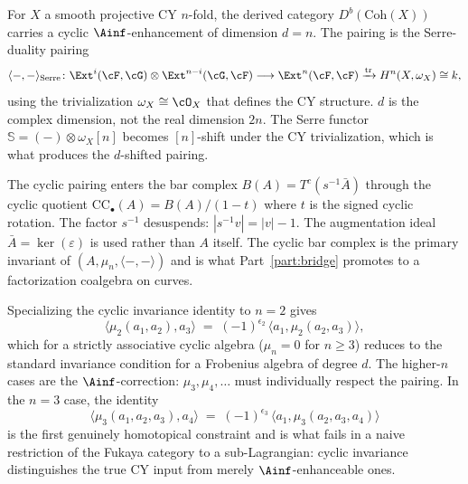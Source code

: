 \begin{remark}
\label{rem:d-geometric}
For $X$ a smooth projective CY $n$-fold, the derived category $D^b(\mathrm{Coh}(X))$ carries a cyclic $\Ainf$-enhancement of dimension $d = n$. The pairing is the Serre-duality pairing
\[
 \langle -, - \rangle_{\mathrm{Serre}} \colon
 \Ext^i(\cF, \cG) \otimes \Ext^{n-i}(\cG, \cF) \longrightarrow \Ext^n(\cF, \cF) \xrightarrow{\mathrm{tr}} H^n(X, \omega_X) \cong k,
\]
using the trivialization $\omega_X \cong \cO_X$ that defines the CY structure. $d$ is the complex dimension, not the real dimension $2n$. The Serre functor $\mathbb{S} = (-) \otimes \omega_X[n]$ becomes $[n]$-shift under the CY trivialization, which is what produces the $d$-shifted pairing.
\end{remark}

\begin{remark}
\label{rem:cyclic-bar-complex}
The cyclic pairing enters the bar complex $B(A) = T^c(s^{-1}\bar A)$ through the cyclic quotient $\mathrm{CC}_\bullet(A) = B(A)/(1 - t)$ where $t$ is the signed cyclic rotation. The factor $s^{-1}$ desuspends: $|s^{-1}v| = |v| - 1$. The augmentation ideal $\bar A = \ker(\varepsilon)$ is used rather than $A$ itself. The cyclic bar complex is the primary invariant of $(A, \mu_n, \langle-,-\rangle)$ and is what Part~\ref{part:bridge} promotes to a factorization coalgebra on curves.
\end{remark}

\begin{remark}[Cyclic symmetry at \texorpdfstring{$n = 2$}{n = 2}]
\label{rem:cyclic-n2}
Specializing the cyclic invariance identity to $n = 2$ gives
\[
 \langle \mu_2(a_1, a_2), a_3 \rangle \;=\; (-1)^{\epsilon_2}\, \langle a_1, \mu_2(a_2, a_3) \rangle,
\]
which for a strictly associative cyclic algebra ($\mu_n = 0$ for $n \geq 3$) reduces to the standard invariance condition for a Frobenius algebra of degree $d$. The higher-$n$ cases are the $\Ainf$-correction: $\mu_3, \mu_4, \ldots$ must individually respect the pairing. In the $n = 3$ case, the identity
\[
 \langle \mu_3(a_1, a_2, a_3), a_4 \rangle \;=\; (-1)^{\epsilon_3}\, \langle a_1, \mu_3(a_2, a_3, a_4) \rangle
\]
is the first genuinely homotopical constraint and is what fails in a naive restriction of the Fukaya category to a sub-Lagrangian: cyclic invariance distinguishes the true CY input from merely $\Ainf$-enhanceable ones.
\end{remark}

